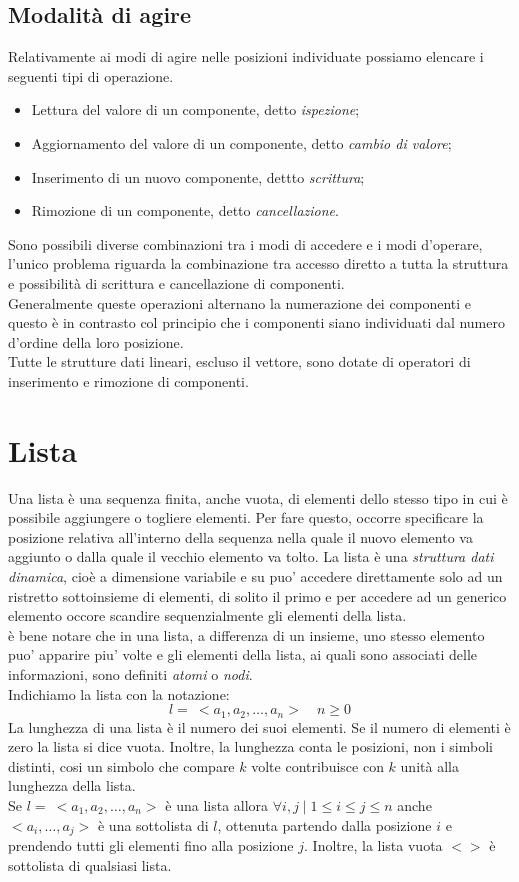 \documentclass[12pt]{report}
\begin{document}
	\subsection{Modalità di agire}
	Relativamente ai modi di agire nelle posizioni individuate possiamo elencare i seguenti tipi di operazione.
	\begin{itemize}
		\item Lettura del valore di un componente, detto \textit{ispezione};
		\item Aggiornamento del valore di un componente, detto \textit{cambio di valore};
		\item Inserimento di un nuovo componente, dettto \textit{scrittura};
		\item Rimozione di un componente, detto \textit{cancellazione}.
	\end{itemize}
	Sono possibili diverse combinazioni tra i modi di accedere e i modi d'operare, l'unico problema riguarda la combinazione tra accesso diretto a tutta la struttura e possibilità di scrittura e cancellazione di componenti. \\
	Generalmente queste operazioni alternano la numerazione dei componenti e questo è in contrasto col principio che i componenti siano individuati dal numero d'ordine della loro posizione. \\
	Tutte le strutture dati lineari, escluso il vettore, sono dotate di operatori di inserimento e rimozione di componenti.
	\section{Lista}
	Una lista è una sequenza finita, anche vuota, di elementi dello stesso tipo in cui è possibile aggiungere o togliere elementi. Per fare questo, occorre specificare la posizione relativa all'interno della sequenza nella quale il nuovo elemento va aggiunto o dalla quale il vecchio elemento va tolto. La lista è una \textit{struttura dati dinamica}, cioè a dimensione variabile e su puo' accedere direttamente solo ad un ristretto sottoinsieme di elementi, di solito il primo e per accedere ad un generico elemento occore scandire sequenzialmente gli elementi della lista. \\
	è bene notare che in una lista, a differenza di un insieme, uno stesso elemento puo' apparire piu' volte e gli elementi della lista, ai quali sono associati delle informazioni, sono definiti \textit{atomi} o \textit{nodi}. \\
	Indichiamo la lista con la notazione:
	\[
	l =\ < a_1, a_2, \dots, a_n > \quad n \geq 0
	\]
	La lunghezza di una lista è il numero dei suoi elementi. Se il numero di elementi è zero la lista si dice vuota. Inoltre, la lunghezza conta le posizioni, non i simboli distinti, cosi un simbolo che compare $k$ volte contribuisce con $k$ unità alla lunghezza della lista. \\
	Se $l =\ <a_1, a_2, \dots, a_n>$ è una lista allora $\forall i, j \mid 1 \leq i \leq j \leq n$ anche $<a_i, \dots, a_j>$ è una sottolista di $l$, ottenuta partendo dalla posizione $i$ e prendendo tutti gli elementi fino alla posizione $j$. Inoltre, la lista vuota $<>$ è sottolista di qualsiasi lista.
\end{document}

